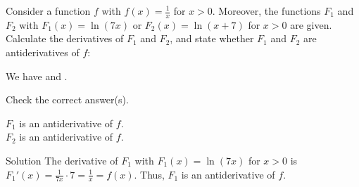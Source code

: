 \begin{MExercises}
%

\begin{MExercise}
Consider a function $f$ with $f(x) = \frac{1}{x}$ for $x > 0$.
Moreover, the functions $F_1$ and $F_2$ with
$F_1(x) = \ln(7x)$ or $F_2(x) = \ln(x + 7)$ for $x > 0$ are given.
Calculate the derivatives of $F_1$ and $F_2$, and state whether $F_1$ and $F_2$ are antiderivatives of $f$:

We have
and 
 . 

Check the correct answer(s).
\par
\begin{MQuestionGroup}
 $F_1$ is an antiderivative of $f$.\ \\
 $F_2$ is an antiderivative of $f$.\ \\
\end{MQuestionGroup}
\par
{}

\begin{MHint}{Solution}
The derivative of $F_1$ with $F_1(x) = \ln(7 x)$ for $x > 0$ is
$F_1'(x) = \frac{1}{7 x} \cdot 7 = \frac{1}{x} = f(x)$. Thus, $F_1$ is an antiderivative
of $f$.


\end{MHint}
\end{MExercise}
\end{MExercises}
